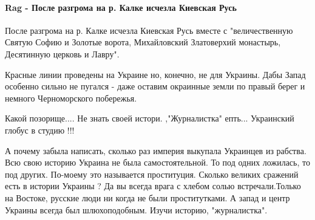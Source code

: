  
 
 
 
 
\paragraph{Rag - После разгрома на р. Калке исчезла Киевская Русь}
\label{sec:14_07_2021.fb.krjukova_svetlana.1.statja_putina_mnenie.cmt.rag_kievrus}

\begin{itemize}

 

После разгрома на р. Калке исчезла Киевская Русь вместе с "величественную
Святую Софию и Золотые ворота, Михайловский Златоверхий монастырь, Десятинную
церковь и Лавру".

Красные линии проведены на Украине но, конечно, не для Украины. Дабы Запад
особенно сильно не пугался - даже оставим окраинные земли по правый берег и
немного Черноморского побережья.


 
Какой позорище.... Не знать своей истори. ,"Журналистка" епть... Украинский
глобус в студию !!!


 

А почему забыла написать, сколько раз империя выкупала Украинцев из рабства.
Всю свою историю Украина не была самостоятельной. То под одних ложилась, то под
других. По-моему это называется проституция. Сколько великих сражений есть в
истории Украины ? Да вы всегда врага с хлебом солью встречали.Только на
Востоке, русские люди ни когда не были проститутками. А запад и центр Украины
всегда был шлюхоподобным. Изучи историю, "журналистка".


\end{itemize}
